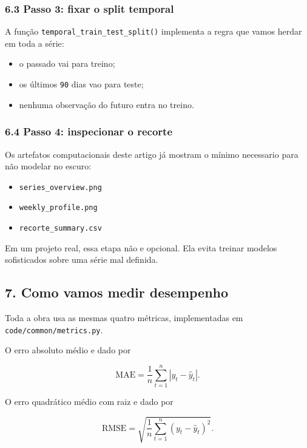 \documentclass[12pt]{article}
\providecommand{\tightlist}{%
          \setlength{\itemsep}{0pt}\setlength{\parskip}{0pt}}
\begin{document}
\subsubsection{6.3 Passo 3: fixar o split temporal}\label{63-passo-3-fixar-o-split-temporal}

A função \texttt{temporal\_train\_test\_split()} implementa a regra que vamos herdar em toda a série:

\begin{itemize}
\tightlist
\item
  o passado vai para treino;
\item
  os últimos \texttt{90} dias vao para teste;
\item
  nenhuma observação do futuro entra no treino.
\end{itemize}

\subsubsection{6.4 Passo 4: inspecionar o recorte}\label{64-passo-4-inspecionar-o-recorte}

Os artefatos computacionais deste artigo já mostram o mínimo necessario para não modelar no escuro:

\begin{itemize}
\tightlist
\item
  \texttt{series\_overview.png}
\item
  \texttt{weekly\_profile.png}
\item
  \texttt{recorte\_summary.csv}
\end{itemize}

Em um projeto real, essa etapa não e opcional. Ela evita treinar modelos sofisticados sobre uma série mal definida.

\subsection{7. Como vamos medir desempenho}\label{7-como-vamos-medir-desempenho}

Toda a obra usa as mesmas quatro métricas, implementadas em \texttt{code/common/metrics.py}.

O erro absoluto médio e dado por

\[
\mathrm{MAE} = \frac{1}{n} \sum_{t=1}^n |y_t - \hat{y}_t|.
\]

O erro quadrático médio com raiz e dado por

\[
\mathrm{RMSE} = \sqrt{\frac{1}{n} \sum_{t=1}^n (y_t - \hat{y}_t)^2}.
\]
\end{document}
